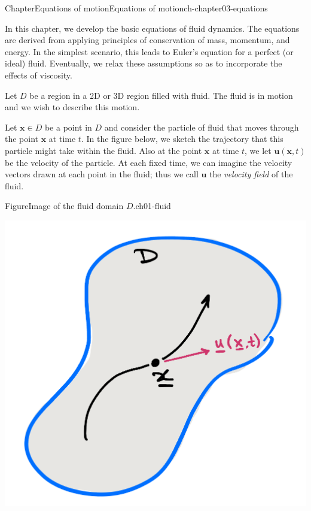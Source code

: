 \documentclass[oneside,10pt,]{book}
\numberwithin{equation}{section}
\newcommand{\bx}{\boldsymbol{x}}
\newcommand{\bu}{\boldsymbol{u}}
\begin{document}
%
%
\typeout{************************************************}
\typeout{************************************************}
%
\begin{chapterptx}{Chapter}{Equations of motion}{}{Equations of motion}{}{}{ch-chapter03-equations}
\renewcommand*{\chaptername}{Chapter}
\begin{introduction}{}%
In this chapter, we develop the basic equations of fluid dynamics. The equations are derived from applying principles of conservation of mass, momentum, and energy. In the simplest scenario, this leads to Euler's equation for a perfect (or ideal) fluid. Eventually, we relax these assumptions so as to incorporate the effects of viscosity.%
\par
Let \(D\) be a region in a 2D or 3D region filled with fluid. The fluid is in motion and we wish to describe this motion.%
\par
Let \(\bx\in D\) be a point in \(D\) and consider the particle of fluid that moves through the point \(\bx\) at time \(t\). In the figure below, we sketch the trajectory that this particle might take within the fluid. Also at the point \(\bx\) at time \(t\), we let \(\bu(\bx, t)\) be the velocity of the particle. At each fixed time, we can imagine the velocity vectors drawn at each point in the fluid; thus we call \(\bu\) the \emph{velocity field} of the fluid.%
\begin{figureptx}{Figure}{Image of the fluid domain \(D\).}{ch01-fluid}{}%
\begin{image}{0.25}{0.5}{0.25}{}%
\includegraphics[width=\linewidth]{external/ch-chapter01-equations-fluid.png}

\end{image}
\end{figureptx}
\end{introduction}
\end{chapterptx}
\end{document}
